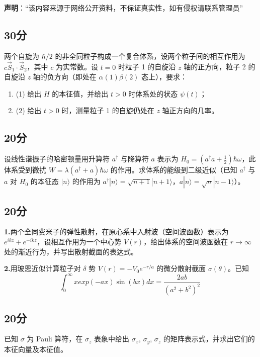 
\textbf{声明}：“该内容来源于网络公开资料，不保证真实性，如有侵权请联系管理员”

\subsection{30分}
两个自旋为 $\hbar/2$ 的非全同粒子构成一个复合体系，设两个粒子间的相互作用为 $c\vec{S}_1 \cdot \vec{S}_2$，其中 $c$ 为实常数。设 $t=0$ 时粒子 1 的自旋沿 $z$ 轴的正方向，粒子 2 的自旋沿 $z$ 轴的负方向（即处在 $\alpha(1)\beta(2)$ 态上），要求：

\begin{enumerate}
    \item (1) 给出 $H$ 的本征值，并给出 $t > 0$ 时体系处的状态 $\psi(t)$；
    \item (2) 给出 $t > 0$ 时，测量粒子 1 的自旋仍处在 $z$ 轴正方向的几率。
\end{enumerate}
\subsection{20分}
设线性谐振子的哈密顿量用升算符 $a^\dagger$ 与降算符 $a$ 表示为 $H_0 = \left(a^\dagger a + \frac{1}{2}\right)\hbar\omega$，此体系受到微扰 $W = \lambda(a^\dagger + a)\hbar\omega$ 的作用。求体系的能级到二级近似（已知 $a^\dagger$ 与 $a$ 对 $H_0$ 的本征态 $|n\rangle$ 的作用为 $a^\dagger|n\rangle = \sqrt{n+1}|n+1\rangle$，$a|n\rangle = \sqrt{n}|n-1\rangle$）。
\subsection{20分}
\textbf{1.}两个全同费米子的弹性散射，在原心系中入射波（空间波函数）表示为 $e^{ikz} + e^{-ikz}$，设相互作用为一个中心势 $V(r)$，给出体系的空间波函数在 $r \to \infty$ 处的渐近行为，并写出散射截面的表达式。

\textbf{2.}用玻恩近似计算粒子对 $\delta$ 势 $V(r) = -V_0 e^{-r/a}$ 的微分散射截面 $\sigma(\theta)$。已知
$$\int_{0}^{\infty} xexp(-ax) \sin(bx) dx = \frac{2ab}{(a^2 + b^2)^2}~$$
\subsection{20分}
已知 $\sigma$ 为 Pauli 算符，在 $ \sigma_z$ 表象中给出 $\sigma_x$, $\sigma_y$, $\sigma_z$ 的矩阵表示式，并求出它们的本征向量及本征值。

